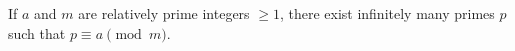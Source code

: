 If $a$ and $m$ are relatively prime integers $\geq 1$, there exist infinitely many primes $p$ such that $p \equiv a \pmod{m}$.
